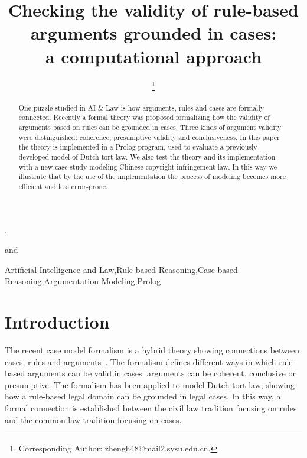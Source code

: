 \documentclass{IOS-Book-Article}
\begin{document}
\pagestyle{headings}
\def\thepage{}

\begin{frontmatter} 

\title{Checking the validity of rule-based arguments grounded in cases: \\a computational approach}


\author[A]{ \thanks{Corresponding Author: zhengh48@mail2.sysu.edu.cn.}}, \author[B]{ } and \author[A]{ }

\address[A]{Artificial Intelligence, University of Groningen, The Netherlands}
\address[B]{Institute of Logic and Cognition, Sun Yat-sen University, Guangzhou, China}

\begin{abstract}
One puzzle studied in AI \& Law is how arguments, rules and cases are formally connected. Recently a formal theory was proposed formalizing how the validity of arguments based on rules can be grounded in cases. Three kinds of argument validity were distinguished: coherence, presumptive validity and conclusiveness. In this paper the theory is implemented in a Prolog program, used to evaluate a previously developed model of Dutch tort law. We also test the theory and its implementation with a new case study modeling Chinese copyright infringement law. In this way we illustrate that by the use of the implementation the process of modeling becomes more efficient and less error-prone.
\end{abstract}

\begin{keyword}
Artificial Intelligence and Law\sep Rule-based Reasoning\sep Case-based Reasoning\sep Argumentation Modeling\sep Prolog
\end{keyword}
\end{frontmatter}

\section{Introduction}
\noindent 
The recent case model formalism \citep{Verheij2016Correct} is a hybrid theory showing connections between cases, rules and arguments~\citep{Verheij2017Formalizing}. The formalism defines different ways in which rule-based arguments can be valid in cases: arguments can be coherent, conclusive or presumptive. The formalism has been applied to model Dutch tort law, showing how a rule-based legal domain can be grounded in legal cases. In this way, a formal connection is established between the civil law tradition focusing on rules and the common law tradition focusing on cases. 
\end{document}
